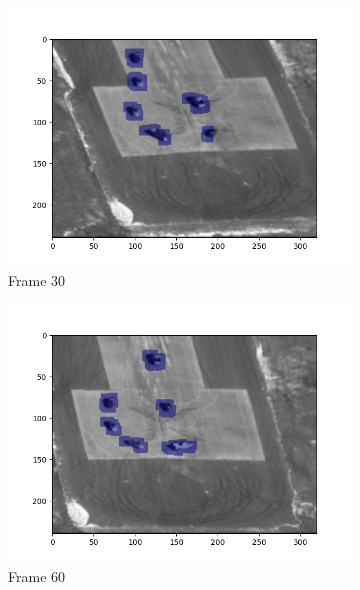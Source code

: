 \documentclass{article} %
\begin{document}
    \begin{figure}[H]
        \centering
        \begin{subfigure}[b]{0.49\textwidth}
            \centering
            \includegraphics[width=\textwidth]{q3,3_frame30.png}
            \caption{Frame 30}
        \end{subfigure}
        \begin{subfigure}[b]{0.49\textwidth}
            \centering
            \includegraphics[width=\textwidth]{q3,3_frame60.png}
            \caption{Frame 60}
        \end{subfigure}
        \begin{subfigure}[b]{0.49\textwidth}
            \centering

\end{subfigure}
\end{figure}
\end{document}
